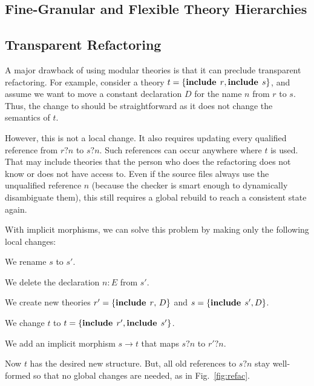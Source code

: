 \subsection{Fine-Granular and Flexible Theory Hierarchies}


\subsection{Transparent Refactoring}

A major drawback of using modular theories is that it can preclude transparent refactoring.
For example, consider a theory $t=\{\operatorname{\mathbf{include}}{\;r},\operatorname{\mathbf{include}}{\;s}\}$, and assume we want to move a constant declaration $D$ for the name $n$ from $r$ to $s$.
Thus, the change to should be straightforward as it does not change the semantics of $t$.

However, this is not a local change.
It also requires updating every qualified reference from $r?n$ to $s?n$.
Such references can occur anywhere where $t$ is used.
That may include theories that the person who does the refactoring does not know or does not have access to.
Even if the source files always use the unqualified reference $n$ (because the checker is smart enough to dynamically disambiguate them), this still requires a global rebuild to reach a consistent state again.

With implicit morphisms, we can solve this problem by making only the following local changes:
\begin{compactenum}
  \item We rename $s$ to $s'$.
  \item We delete the declaration $n:E$ from $s'$.
  \item We create new theories $r'=\{\operatorname{\mathbf{include}}{\;r},\,D\}$ and $s=\{\operatorname{\mathbf{include}}{\;s'},D\}$.
  \item We change $t$ to $t=\{\operatorname{\mathbf{include}}{\;r'},\operatorname{\mathbf{include}}{\;s'}\}$.
  \item We add an implicit morphism $s\to t$ that maps $s?n$ to $r'?n$.
\end{compactenum}
Now $t$ has the desired new structure.
But, all old references to $s?n$ stay well-formed so that no global changes are needed, as in Fig.~\ref{fig:refac}.

